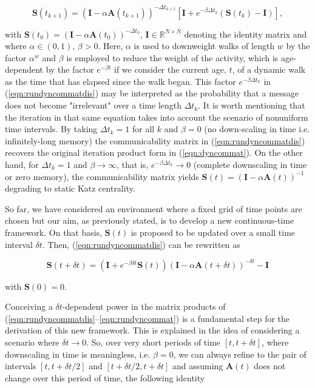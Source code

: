\begin{equation}
\label{eqn:rundyncommatdis}
    \mathbf{S}(t_{k+1}) = (\mathbf{I} -  \alpha \mathbf{A}(t_{k+1}))^{-\Delta t_{k+1}}\left[\mathbf{I} + e^{-\beta\Delta t_k} (\mathbf{S}(t_k) - \mathbf{I})\right],
\end{equation} 

 with $\mathbf{S}(t_0) = (\mathbf{I} - \alpha \mathbf{A}(t_0))^{-\Delta t_0}$, $\mathbf{I}\in \mathbb{R}^{N\times N}$ denoting the identity matrix and where $\alpha \in (0,1)$, $\beta > 0$. Here, $\alpha$ is used to downweight walks of length $w$ by the factor $\alpha^w$ and $\beta$ is employed to reduce the weight of the activity, which is age-dependent by the factor $e^{-\beta t}$ if we consider the current age, $t$, of a dynamic walk as the time that has elapsed since the walk began. This factor $e^{-\beta\Delta t_k}$ in (\ref{eqn:rundyncommatdis}) may be interpreted as the probability that a message does not become "irrelevant" over a time length $\Delta t_k$. It is worth mentioning that the iteration in that same equation takes into account the scenario of nonuniform time intervals. By taking $\Delta t_k = 1$ for all $k$ and $\beta = 0$ (no down-scaling in time i.e. infinitely-long memory) the communicability matrix in (\ref{eqn:rundyncommatdis}) recovers the original iteration product form in (\ref{eqn:dyncommat}). On the other hand, for $\Delta t_k = 1$ and $\beta \to \infty$, that is, $e^{-\beta\Delta t_k}\to 0$ (complete downscaling in time or zero memory), the communicability matrix yields $\mathbf{S}(t)=(\mathbf{I} - \alpha \mathbf{A}(t))^{-1}$ degrading to static Katz centrality.

 So far, we have considered an environment where a fixed grid of time points are chosen but our aim, as previously stated, is to develop a new continuous-time framework. On that basis, $\mathbf{S}(t)$ is proposed to be updated over a small time interval $\delta t$. Then, (\ref{eqn:rundyncommatdis}) can be rewritten as
 
 \begin{equation}
\label{eqn:rundyncommat}
    \mathbf{S}(t + \delta t) = (\mathbf{I} + e^{-\beta\delta t}\mathbf{S}(t)) (\mathbf{I} - \alpha\mathbf{A}(t+\delta t))^{-\delta t} - \mathbf{I}
\end{equation} 

with $\mathbf{S}(0)=0$.

Conceiving a $\delta t$-dependent power in the matrix products of (\ref{eqn:rundyncommatdis}--\ref{eqn:rundyncommat}) is a fundamental step for the derivation of this new framework. This is explained in the idea of considering a scenario where $\delta t \to 0$. So, over very short periods of time $[t,t+\delta t]$, where downscaling in time is meaningless, i.e. $\beta = 0$, we can always refine to the pair of intervals $[t, t + \delta t/2]$ and $[t + \delta t/2, t + \delta t]$ and assuming $\mathbf{A}(t)$ does not change over this period of time, the following identity 

